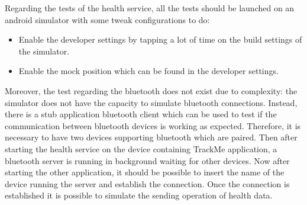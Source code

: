 Regarding the tests of the health service, all the tests should be launched on an android simulator with some tweak configurations to do:
\begin{itemize}
\item Enable the developer settings by tapping a lot of time on the build settings of the simulator.
\item Enable the mock position which can be found in the developer settings.
\end{itemize}
Moreover, the test regarding the bluetooth does not exist due to complexity: the simulator does not have the capacity to simulate bluetooth connections. Instead, there is a stub application bluetooth client which can be used to test if the communication between bluetooth devices is working as expected. Therefore, it is necessary to have two devices supporting bluetooth which are paired. Then after starting the health service on the device containing TrackMe application, a bluetooth server is running in background waiting for other devices. Now after starting the other application, it should be possible to insert the name of the device running the server and establish the connection. Once the connection is established it is possible to simulate the sending operation of health data.


